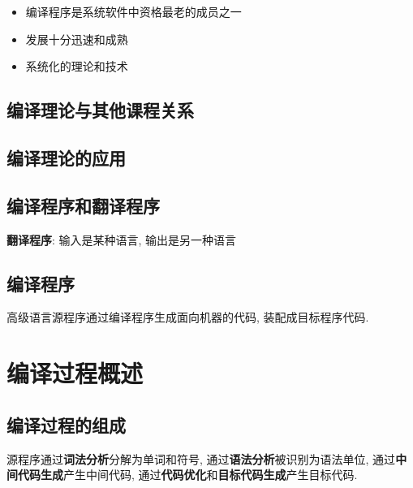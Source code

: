         \begin{itemize}
            \item 编译程序是系统软件中资格最老的成员之一
            \item 发展十分迅速和成熟
            \item 系统化的理论和技术
        \end{itemize}


    \subsection{编译理论与其他课程关系}

    \subsection{编译理论的应用}

    \subsection{编译程序和翻译程序}

        \textbf{翻译程序}: 输入是某种语言, 输出是另一种语言

    \subsection{编译程序}

        高级语言源程序通过编译程序生成面向机器的代码, 装配成目标程序代码.

\section{编译过程概述}

    \subsection{编译过程的组成}

        源程序通过\textbf{词法分析}分解为单词和符号, 通过\textbf{语法分析}被识别为语法单位, 通过\textbf{中间代码生成}产生中间代码, 通过\textbf{代码优化}和\textbf{目标代码生成}产生目标代码.
